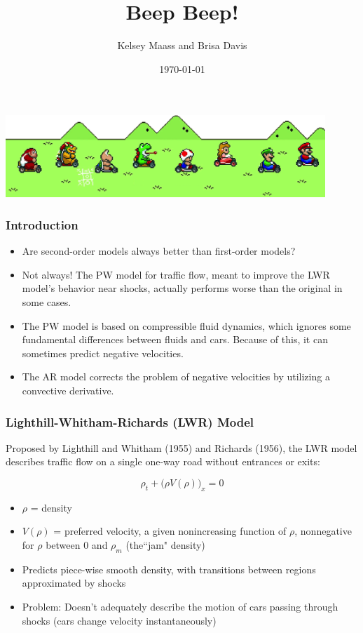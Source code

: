 \documentclass{beamer}
\title[Short title]{Beep Beep!} %
\author{Kelsey Maass and Brisa Davis} %
\institute[UW] %
{
AMATH 574 \\ %
Group 6
\medskip
}
\date{\today} %
\begin{document}
\begin{frame}
\titlepage %
\includegraphics[width=4.75in]{mariokart.png}
\end{frame}

\begin{frame}
\frametitle{Introduction} 
\begin{itemize}
\item Are second-order models always better than first-order models?
\item Not always! The PW model for traffic flow, meant to improve the LWR model's behavior near shocks, actually performs worse than the original in some cases.
\item The PW model is based on compressible fluid dynamics, which ignores some fundamental differences between fluids and cars. Because of this, it can sometimes predict negative velocities.
\item The AR model corrects the problem of negative velocities by utilizing a convective derivative.
\end{itemize}
\end{frame}


\begin{frame}
\frametitle{Lighthill-Whitham-Richards (LWR) Model}

Proposed by Lighthill and Whitham (1955) and Richards (1956), the LWR model describes traffic flow on a single one-way road without entrances or exits:

\[ \rho_t + \Big(\rho V(\rho)\Big)_x = 0 \]

\begin{itemize}
\item $\rho$ = density
\item $V(\rho)$  = preferred velocity, a given nonincreasing function of $\rho$, nonnegative for $\rho$ between 0 and $\rho_m$ (the``jam" density)
\item Predicts piece-wise smooth density, with transitions between regions approximated by shocks
\item Problem: Doesn't adequately describe the motion of cars passing through shocks (cars change velocity instantaneously) 
\end{itemize}

\end{frame}
\end{document}
